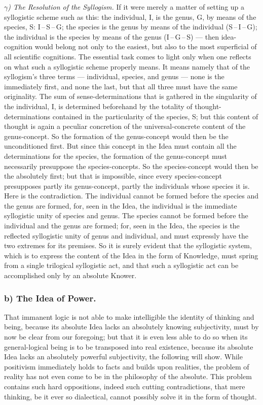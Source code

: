 \documentclass[12pt]{book}
\begin{document}
\emph{$\gamma$) The Resolution of the Syllogism.} If it were merely a matter of
setting up a syllogistic scheme such as this: the individual, I, is the genus, G,
by means of the species, S: I\,--\,S\,--\,G; the species is the genus by means of
the individual (S\,--\,I\,--\,G); the individual is the species by means of the
genus (I\,--\,G\,--\,S) --- then idea-cognition would belong not only to the
easiest, but also to the most superficial of all scientific cognitions. The
essential task comes to light only when one reflects on what such a syllogistic
scheme properly means. It means namely that of the syllogism's three terms ---
individual, species, and genus --- none is the immediately first, and none the
last, but that all three must have the same originality. The sum of
sense-determinations that is gathered in the singularity of the individual, I, is
determined beforehand by the totality of thought-determinations contained in the
particularity of the species, S; but this content of thought is again a peculiar
concretion of the universal-concrete content of the genus-concept. So the
formation of the genus-concept would then be the unconditioned first. But since
this concept in the Idea must contain all the determinations for the species, the
formation of the genus-concept must necessarily presuppose the species-concepts.
So the species-concept would then be the absolutely first; but that is
impossible, since every species-concept presupposes partly its genus-concept,
partly the individuals whose species it is. Here is the contradiction. The
individual cannot be formed before the species and the genus are formed, for, seen
in the Idea, the individual is the immediate syllogistic unity of species and
genus. The species cannot be formed before the individual and the genus are
formed; for, seen in the Idea, the species is the reflected syllogistic unity of
genus and individual, and must expressly have the two extremes for its premises.
So it is surely evident that the syllogistic system, which is to express the
content of the Idea in the form of Knowledge, must spring from a single
trilogical syllogistic act, and that such a syllogistic act can be accomplished
only by an absolute Knower.

\subsubsection*{b) The Idea of Power.} That immanent logic is not able to make
intelligible the identity of thinking and being, because its absolute Idea lacks
an absolutely knowing subjectivity, must by now be clear from our foregoing; but
that it is even less able to do so when its general-logical being is to be
transposed into real existence, because its absolute Idea lacks an absolutely
powerful subjectivity, the following will show. While positivism immediately holds
to facts and builds upon realities, the problem of reality has not even come to be
in the philosophy of the absolute. This problem contains such hard oppositions,
indeed such cutting contradictions, that mere thinking, be it ever so dialectical,
cannot possibly solve it in the form of thought.
\end{document}
